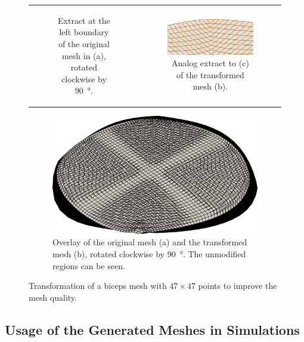 \begin{figure}
\begin{tabular}{cc}
\begin{subfigure}[t]{0.48\textwidth}
      \caption{Extract at the left boundary of the original mesh in (a), rotated clockwise by \SI{90}{\degree}.}%
      \label{fig:mesh47a_}%
    \end{subfigure}
    &
    \begin{subfigure}[t]{0.48\textwidth}%
      \centering%
      \includegraphics[width=\textwidth]{images/parallel_fiber_estimation/mesh47b_.png}
      \caption{Analog extract to (c) of the transformed mesh (b).}%
      \label{fig:mesh47b_}%
    \end{subfigure}    
  \end{tabular}
  \begin{subfigure}[t]{0.7\textwidth}%
    \centering%
    \includegraphics[width=\textwidth]{images/parallel_fiber_estimation/mesh_47ab.png}
    \caption{Overlay of the original mesh (a) and the transformed mesh (b), rotated clockwise by \SI{90}{\degree}. The unmodified regions can be seen.}%
    \label{fig:mesh_47ab}%
  \end{subfigure}
  \caption{Transformation of a biceps mesh with $47\times 47$ points to improve the mesh quality.}%
  \label{fig:mesh47}%
\end{figure}%

%
\subsection{Usage of the Generated Meshes in Simulations}

